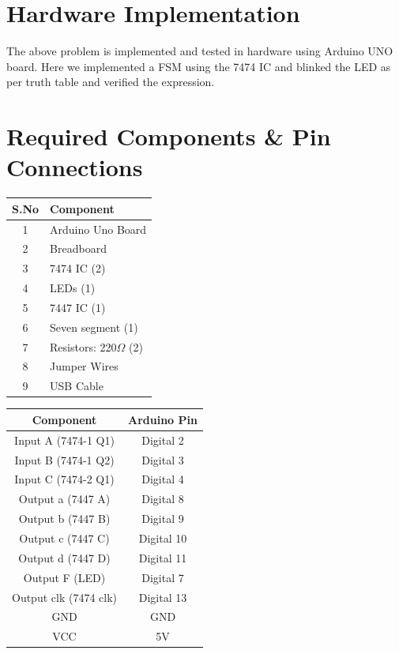 \documentclass[a4paper,12pt]{article}                           \usepackage{amsmath, amssymb}
\begin{document}
\section*{\textbf{Hardware Implementation}}
The above problem is implemented and tested in hardware using Arduino UNO board. Here we implemented a FSM using the 7474 IC and blinked the LED as per truth table and verified the expression.
\section*{Required Components \& Pin Connections}
\begin{center}
\begin{minipage}{0.45\textwidth}
\begin{table}[H]
\centering
\begin{tabular}{|c|l|}
\hline
\textbf{S.No} & \textbf{Component} \\ \hline
1 & Arduino Uno Board \\
2 & Breadboard \\
3 & 7474 IC (2) \\
4 & LEDs (1) \\
5 & 7447 IC (1) \\
6 & Seven segment (1) \\
7 & Resistors: 220$\Omega$ (2) \\
8 & Jumper Wires \\
9 & USB Cable \\
\hline
\end{tabular}
\end{table}
\end{minipage}
\hspace{0.05\textwidth}
\begin{minipage}{0.45\textwidth}
\begin{table}[H]
\centering
\begin{tabular}{|c|c|}
\hline
\textbf{Component} & \textbf{Arduino Pin} \\ \hline
Input A (7474-1 Q1) & Digital 2 \\
Input B (7474-1 Q2) & Digital 3 \\
Input C (7474-2 Q1) & Digital 4 \\
Output a (7447 A) & Digital 8 \\
Output b (7447 B) & Digital 9 \\
Output c (7447 C) & Digital 10 \\
Output d (7447 D) & Digital 11 \\
Output F (LED) & Digital 7 \\
Output clk (7474 clk) & Digital 13 \\
GND & GND \\
VCC & 5V \\
\hline
\end{tabular}
\end{table}
\end{minipage}
\end{center}
\end{document}

